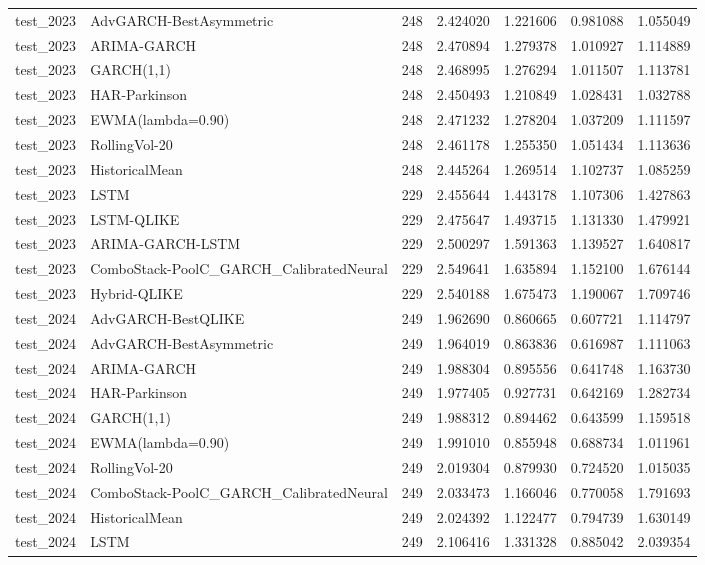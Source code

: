 \begin{tabular}{l l r r r r r}
test\_2023 & AdvGARCH-BestAsymmetric & 248 & 2.424020 & 1.221606 & 0.981088 & 1.055049 \\
test\_2023 & ARIMA-GARCH & 248 & 2.470894 & 1.279378 & 1.010927 & 1.114889 \\
test\_2023 & GARCH(1,1) & 248 & 2.468995 & 1.276294 & 1.011507 & 1.113781 \\
test\_2023 & HAR-Parkinson & 248 & 2.450493 & 1.210849 & 1.028431 & 1.032788 \\
test\_2023 & EWMA(lambda=0.90) & 248 & 2.471232 & 1.278204 & 1.037209 & 1.111597 \\
test\_2023 & RollingVol-20 & 248 & 2.461178 & 1.255350 & 1.051434 & 1.113636 \\
test\_2023 & HistoricalMean & 248 & 2.445264 & 1.269514 & 1.102737 & 1.085259 \\
test\_2023 & LSTM & 229 & 2.455644 & 1.443178 & 1.107306 & 1.427863 \\
test\_2023 & LSTM-QLIKE & 229 & 2.475647 & 1.493715 & 1.131330 & 1.479921 \\
test\_2023 & ARIMA-GARCH-LSTM & 229 & 2.500297 & 1.591363 & 1.139527 & 1.640817 \\
test\_2023 & ComboStack-PoolC\_GARCH\_CalibratedNeural & 229 & 2.549641 & 1.635894 & 1.152100 & 1.676144 \\
test\_2023 & Hybrid-QLIKE & 229 & 2.540188 & 1.675473 & 1.190067 & 1.709746 \\
test\_2024 & AdvGARCH-BestQLIKE & 249 & 1.962690 & 0.860665 & 0.607721 & 1.114797 \\
test\_2024 & AdvGARCH-BestAsymmetric & 249 & 1.964019 & 0.863836 & 0.616987 & 1.111063 \\
test\_2024 & ARIMA-GARCH & 249 & 1.988304 & 0.895556 & 0.641748 & 1.163730 \\
test\_2024 & HAR-Parkinson & 249 & 1.977405 & 0.927731 & 0.642169 & 1.282734 \\
test\_2024 & GARCH(1,1) & 249 & 1.988312 & 0.894462 & 0.643599 & 1.159518 \\
test\_2024 & EWMA(lambda=0.90) & 249 & 1.991010 & 0.855948 & 0.688734 & 1.011961 \\
test\_2024 & RollingVol-20 & 249 & 2.019304 & 0.879930 & 0.724520 & 1.015035 \\
test\_2024 & ComboStack-PoolC\_GARCH\_CalibratedNeural & 249 & 2.033473 & 1.166046 & 0.770058 & 1.791693 \\
test\_2024 & HistoricalMean & 249 & 2.024392 & 1.122477 & 0.794739 & 1.630149 \\
test\_2024 & LSTM & 249 & 2.106416 & 1.331328 & 0.885042 & 2.039354 \\

\end{tabular}
